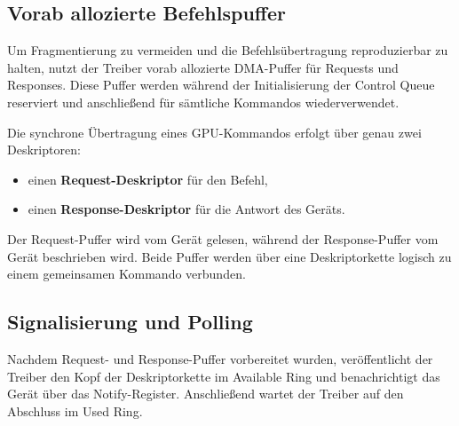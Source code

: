 \subsection{Vorab allozierte Befehlspuffer}
Um Fragmentierung zu vermeiden und die Befehlsübertragung reproduzierbar zu
halten, nutzt der Treiber vorab allozierte DMA-Puffer für Requests und
Responses. Diese Puffer werden während der Initialisierung der Control Queue
reserviert und anschließend für sämtliche Kommandos wiederverwendet.

Die synchrone Übertragung eines GPU-Kommandos erfolgt über genau zwei
Deskriptoren:
\begin{itemize}
    \item einen \textbf{Request-Deskriptor} für den Befehl,
    \item einen \textbf{Response-Deskriptor} für die Antwort des Geräts.
\end{itemize}

Der Request-Puffer wird vom Gerät gelesen, während der Response-Puffer vom Gerät
beschrieben wird. Beide Puffer werden über eine Deskriptorkette logisch zu
einem gemeinsamen Kommando verbunden.

\begin{center}
\end{center}

\subsection{Signalisierung und Polling}
Nachdem Request- und Response-Puffer vorbereitet wurden, veröffentlicht der
Treiber den Kopf der Deskriptorkette im Available Ring und benachrichtigt das
Gerät über das Notify-Register. Anschließend wartet der Treiber auf den
Abschluss im Used Ring.

